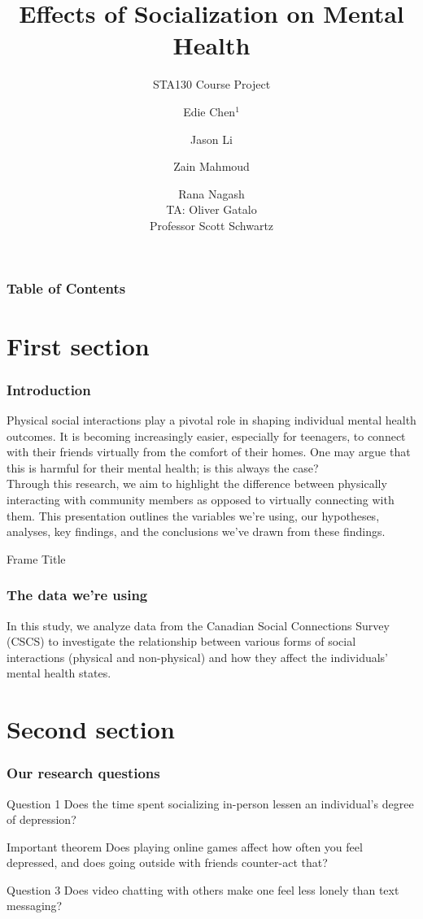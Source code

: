 \documentclass{beamer}
\title[Social Connections Analysis]
{Effects of Socialization on Mental Health}
\subtitle{STA130 Course Project}
\author[STA130] %
{Edie Chen$^1$ \and Jason Li \and Zain Mahmoud \and Rana Nagash\\
TA: Oliver Gatalo\\
Professor Scott Schwartz}
\institute[UofT] %
{
  STA130: An Introduction to Statistical Reasoning and Data Science\\
  Department of Statistical Sciences\\
  University of Toronto
}
\date[November 2024] %
\begin{document}
\frame{\titlepage}

\begin{frame}
\frametitle{Table of Contents}
\tableofcontents
\end{frame}

\section{First section}

\begin{frame}
\frametitle{Introduction}
Physical social interactions play a pivotal role in shaping individual mental health outcomes. It is becoming increasingly easier, especially for teenagers, to connect with their friends virtually from the comfort of their homes. One may argue that this is harmful for their mental health; is this always the case?\\
Through this research, we aim to highlight the difference between physically interacting with community members as opposed to virtually connecting with them. This presentation outlines the variables we're using, our hypotheses, analyses, key findings, and the conclusions we've drawn from these findings.

\end{frame}

\begin{frame}{Frame Title}
    \frametitle{The data we're using}
    In this study, we analyze data from the \alert{Canadian Social Connections Survey (CSCS)} to investigate the relationship between various forms of social interactions (physical and non-physical) and how they affect the individuals' mental health states. 
\end{frame}



\section{Second section}

\begin{frame}
\frametitle{Our research questions}

\begin{block}{Question 1}
Does the time spent socializing in-person lessen an individual’s degree of depression?
\end{block}

\begin{alertblock}{Important theorem}
Does playing online games affect how often you feel depressed, and does going outside with friends counter-act that? 
\end{alertblock}

\begin{block}{Question 3}
    Does video chatting with others make one feel less lonely than text messaging? 
\end{block}


\end{frame}
\end{document}
